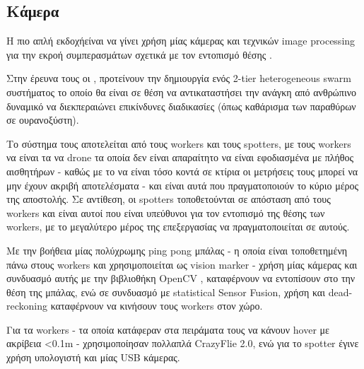 \subsection{Κάμερα} \label{sec:related-camera}
H πιο απλή εκδοχή\udot είναι να γίνει χρήση μίας κάμερας και τεχνικών image processing για την εκροή συμπερασμάτων σχετικά με τον εντοπισμό θέσης .

Στην έρευνα τους οι \cite{related-simple-camera}, προτείνουν την δημιουργία ενός 2-tier heterogeneous  swarm συστήματος το οποίο θα είναι σε θέση να αντικαταστήσει την ανάγκη από ανθρώπινο δυναμικό να διεκπεραιώνει επικίνδυνες διαδικασίες (όπως καθάρισμα των παραθύρων σε ουρανοξύστη).

Το σύστημα τους αποτελείται από τους workers και τους spotters, με τους workers να είναι τα να drone τα οποία δεν είναι απαραίτητο να είναι εφοδιασμένα με πλήθος αισθητήρων - καθώς με το να είναι τόσο κοντά σε κτίρια οι μετρήσεις τους μπορεί να μην έχουν ακριβή αποτελέσματα - και είναι αυτά που πραγματοποιούν το κύριο μέρος της αποστολής. Σε αντίθεση, οι spotters τοποθετούνται σε απόσταση από τους workers και είναι αυτοί που είναι υπεύθυνοι για τον εντοπισμό της θέσης των workers, με το μεγαλύτερο μέρος της επεξεργασίας να πραγματοποιείται σε αυτούς.

Με την βοήθεια μίας πολύχρωμης ping pong μπάλας - η οποία είναι τοποθετημένη πάνω στους workers και χρησιμοποιείται ως vision marker - χρήση μίας κάμερας και συνδυασμό αυτής με την βιβλιοθήκη OpenCV \cite{opencv}, καταφέρνουν να εντοπίσουν στο  την θέση της μπάλας, ενώ σε συνδυασμό με statistical Sensor Fusion, χρήση  και dead-reckoning καταφέρνουν να κινήσουν τους workers στον χώρο.

Για τα workers - τα οποία κατάφεραν στα πειράματα τους να κάνουν hover με ακρίβεια <0.1m - χρησιμοποίησαν πολλαπλά CrazyFlie 2.0, ενώ για το spotter έγινε χρήση υπολογιστή και μίας USB κάμερας.

